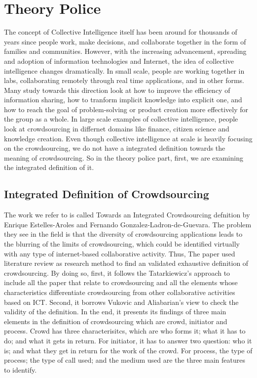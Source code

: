 \section{Theory Police}
The concept of Collective Intelligence itself has been around for thousands of years since people work, make decisions, and collaborate together in the form of families and communities. However, with the increasing advancement, spreading and adoption of information technologies and Internet, the idea of collective intelligence changes dramatically. In small scale, people are working together in labs, collaborating remotely through real time applications, and in other forms. Many study towards this direction look at how to improve the efficiency of information sharing, how to tranform implicit knowledge into explicit one, and how to reach the goal of problem-solving or product creation more effectively for the group as a whole. In large scale examples of collective intelligence, people look at crowdsourcing in differnet domains like finance, citizen science and knowledge creation. Even though collective intelligence at scale is heavily focusing on the crowdsourcing, we do not have a integrated definition towards the meaning of crowdsourcing. So in the theory police part, first, we are examining the integrated definition of it.

\subsection{Integrated Definition of Crowdsourcing}
The work we refer to is called Towards an Integrated Crowdsourcing defnition by Enrique Estelles-Aroles and Fernando Gonzalez-Ladron-de-Guevara. The problem they see in the field is that the diversity of crowdsourcing applications leads to the blurring of the limits of crowdsourcing, which could be identified virtually with any type of internet-based collaborative activity. Thus, The paper used literature review as research method to find an validated exhaustive definition of crowdsourcing. By doing so, first, it follows the Tatarkiewicz's approach to include all the paper that relate to crowdsourcing and all the elements whose characteristics differentiate crowdsourcing from other collaborative activities based on ICT. Second, it borrows Vukovic and Aliabarian's view to check the validity of the definition. In the end, it presents its findings of three main elements in the definition of crowdsourcing which are crowd, initiator and process. Crowd has three characterisitcs, which are who forms it; what it has to do; and what it gets in return. For initiator, it has to answer two question: who it is; and what they get in return for the work of the crowd. For process, the type of process; the type of call used; and the medium used are the three main features to identify\cite{theorypolice1}.

